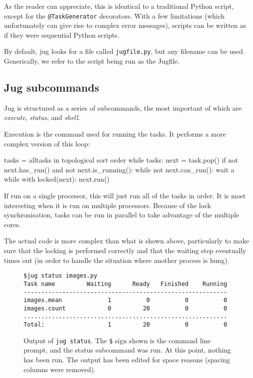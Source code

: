 \documentclass{article}
\let\code\texttt
\begin{document}
As the reader can appreciate, this is identical to a traditional Python script,
except for the \code{@TaskGenerator} decorators. With a few limitations (which
unfortunately can give rise to complex error messages), scripts can be written
as if they were sequential Python scripts.

By default, jug looks for a file called \code{jugfile.py}, but any filename can
be used. Generically, we refer to the script being run as the Jugfile.

\subsection{Jug subcommands}

Jug is structured as a series of subcommands, the most important of which are
\emph{execute}, \emph{status}, and \emph{shell}.

Execution is the command used for running the tasks. It performs a more complex
version of this loop:

\begin{python}
tasks = alltasks in topological sort order
while tasks:
    next = task.pop()
    if not next.has_run() and not next.is_running():
        while not next.can_run():
            wait a while
        with locked(next):
            next.run()
\end{python}

If run on a single processor, this will just run all of the tasks in order. It
is most interesting when it is run on multiple processors. Because of the lock
synchronisation, tasks can be run in parallel to take advantage of the multiple
cores.


The actual code is more complex than what is shown above, particularly to make
sure that the locking is performed correctly and that the waiting step
eventually times out (in order to handle the situation where another process is
hung).

\begin{figure}
\begin{verbatim}
$jug status images.py
Task name         Waiting      Ready   Finished    Running
----------------------------------------------------------
images.mean             1          0          0          0
images.count            0         20          0          0
..........................................................
Total:                  1         20          0          0
\end{verbatim}
\caption{Output of \code{jug status}. The \texttt{\$} sign shown is the command
line prompt, and the status subcommand was run. At this point, nothing has been
run. The output has been edited for space reasons (spacing columns were
removed).}
\label{fig:jug-status-output}
\end{figure}
\end{document}
